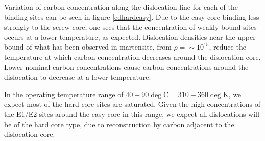 \documentclass[a4paper,11pt]{article}
\begin{document}
Variation of carbon concentration along the dislocation line for each of the binding sites can be
seen in figure \ref{cdhardeasy}. Due to the easy core binding less strongly to the screw core, one
sees that the concentration of weakly bound sites occurs at a lower temperature, as
expected. Dislocation densities near the upper bound of what has been observed in martensite,
from \(\rho = \sim10^{15}\), reduce the temperature at which carbon concentration decreases around the
dislocation core. Lower nominal carbon concentrations cause carbon concentrations
around the dislocation to decrease at a lower temperature. 

In the operating temperature range of \(40-90\deg\text{C} = 310-360\deg\text{K}\), we expect most
of the hard core sites are saturated. Given the high concentrations of the E1/E2 sites around
the easy core in this range, we expect all dislocations will be of the hard core type, due to
reconstruction by carbon adjacent to the dislocation core. 
\end{document}
